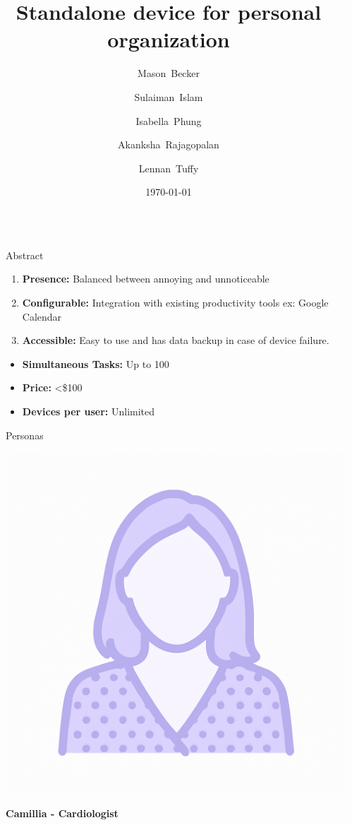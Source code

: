 \documentclass[final]{beamer}
\title{Standalone device for personal organization}
\author{
  Mason~Becker
  \and
  Sulaiman~Islam
  \and
  Isabella~Phung
  \and
  Akanksha~Rajagopalan
  \and
  Lennan~Tuffy
}
\institute[UC Santa Cruz]{CSE 123 - Supervised by Prof. David Harrison}
\date{\today}
\newlength{\sepwidth}
\newlength{\colwidth}
\newcommand{\separatorcolumn}{\begin{column}{\sepwidth}\end{column}}
\begin{document}
\begin{frame}[t]
  \begin{columns}[t]
    \separatorcolumn

    \begin{column}{\colwidth}

      \begin{block}{Abstract}
        \begin{enumerate}
          \item \textbf{Presence:} Balanced between annoying and unnoticeable
          \item \textbf{Configurable:} Integration with existing productivity tools ex: Google Calendar
          \item \textbf{Accessible:} Easy to use and has data backup in case of device failure.
        \end{enumerate}
        \begin{itemize}
          \item \textbf{Simultaneous Tasks:} Up to 100
          \item \textbf{Price:} <\$100
          \item \textbf{Devices per user:} Unlimited
        \end{itemize}
      \end{block}

      \begin{block}{Personas} 
    
    \begin{minipage}[t]{0.3\linewidth}
      \centering
      \includegraphics[width=0.8\linewidth]{camillia.png}
    \end{minipage}
    \hfill
    \begin{minipage}[t]{0.65\linewidth}
      \textbf{Camillia - Cardiologist}
      

\end{minipage}
\end{block}
\end{column}
\end{columns}
\end{frame}
\end{document}
